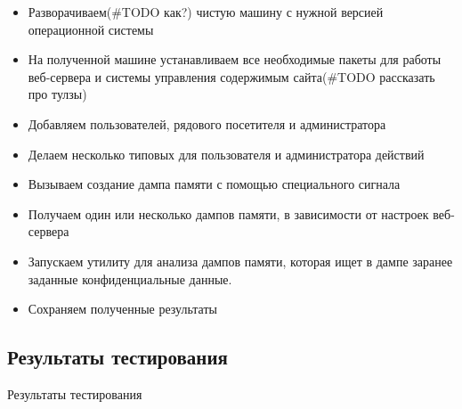 \documentclass[20pt]{article}
\begin{document}
\begin{itemize}
  \item Разворачиваем(#TODO как?) чистую машину с нужной версией операционной системы
  \item На полученной машине устанавливаем все необходимые пакеты для работы
  веб-сервера и системы управления содержимым сайта(#TODO рассказать про тулзы)
  \item Добавляем пользователей, рядового посетителя и администратора
  \item Делаем несколько типовых для пользователя и администратора действий
  \item Вызываем создание дампа памяти с помощью специального сигнала
  \item Получаем один или несколько дампов памяти, в зависимости от настроек
  веб-сервера
  \item Запускаем утилиту для анализа дампов памяти, которая ищет в дампе
  заранее заданные конфиденциальные данные.
  \item Сохраняем полученные результаты
\end{itemize}

\subsection{Результаты тестирования}
Результаты тестирования
\end{document}
